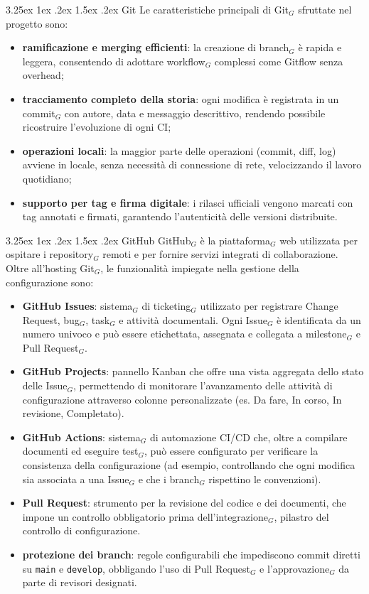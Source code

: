 \documentclass[a4paper, 10pt]{article}
\makeatletter
\renewcommand\paragraph{\@startsection{paragraph}{4}{\z@}%
  {3.25ex \@plus1ex \@minus .2ex}%
  {1.5ex \@plus .2ex}%
  {\normalfont\normalsize\bfseries}}
\makeatother
\begin{document}
\paragraph{Git}
Le caratteristiche principali di Git$_G$ sfruttate nel progetto sono:
\begin{itemize}
    \item \textbf{ramificazione e merging efficienti}: la creazione di branch$_G$ è rapida e leggera, consentendo di adottare workflow$_G$ complessi come Gitflow senza overhead;
    \item \textbf{tracciamento completo della storia}: ogni modifica è registrata in un commit$_G$ con autore, data e messaggio descrittivo, rendendo possibile ricostruire l'evoluzione di ogni CI;
    \item \textbf{operazioni locali}: la maggior parte delle operazioni (commit, diff, log) avviene in locale, senza necessità di connessione di rete, velocizzando il lavoro quotidiano;
    \item \textbf{supporto per tag e firma digitale}: i rilasci ufficiali vengono marcati con tag annotati e firmati, garantendo l'autenticità delle versioni distribuite.
\end{itemize}

\paragraph{GitHub}
GitHub$_G$ è la piattaforma$_G$ web utilizzata per ospitare i repository$_G$ remoti e per fornire servizi integrati di collaborazione. Oltre all'hosting Git$_G$, le funzionalità impiegate nella gestione della configurazione sono:
\begin{itemize}
    \item \textbf{GitHub Issues}: sistema$_G$ di ticketing$_G$ utilizzato per registrare Change Request, bug$_G$, task$_G$ e attività documentali. Ogni Issue$_G$ è identificata da un numero univoco e può essere etichettata, assegnata e collegata a milestone$_G$ e Pull Request$_G$.
    \item \textbf{GitHub Projects}: pannello Kanban che offre una vista aggregata dello stato delle Issue$_G$, permettendo di monitorare l'avanzamento delle attività di configurazione attraverso colonne personalizzate (es. Da fare, In corso, In revisione, Completato).
    \item \textbf{GitHub Actions}: sistema$_G$ di automazione CI/CD che, oltre a compilare documenti ed eseguire test$_G$, può essere configurato per verificare la consistenza della configurazione (ad esempio, controllando che ogni modifica sia associata a una Issue$_G$ e che i branch$_G$ rispettino le convenzioni).
    \item \textbf{Pull Request}: strumento per la revisione del codice e dei documenti, che impone un controllo obbligatorio prima dell'integrazione$_G$, pilastro del controllo di configurazione.
    \item \textbf{protezione dei branch}: regole configurabili che impediscono commit diretti su \texttt{main} e \texttt{develop}, obbligando l'uso di Pull Request$_G$ e l'approvazione$_G$ da parte di revisori designati.
\end{itemize}
\end{document}
